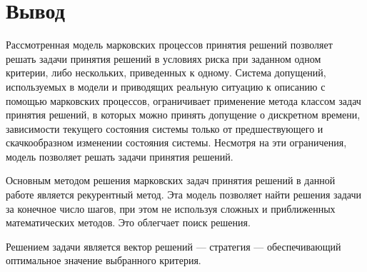 \documentclass[14pt,a4paper,report]{report}
\begin{document}
\section{Вывод}

Рассмотренная модель марковских процессов принятия решений позволяет решать задачи принятия решений в условиях риска при заданном одном критерии, либо нескольких, приведенных к одному. Система допущений, используемых в модели и приводящих реальную ситуацию к описанию с помощью
марковских процессов, ограничивает применение метода классом задач принятия решений, в которых можно принять допущение о дискретном времени, зависимости текущего состояния системы только от предшествующего и скачкообразном изменении состояния системы. Несмотря на эти ограничения, модель позволяет решать задачи принятия решений.

Основным методом решения марковских задач принятия решений в данной работе является рекурентный метод. Эта модель позволяет найти решения задачи за конечное число шагов, при этом не используя сложных и приближенных математических методов. Это облегчает поиск решения.

Решением задачи является вектор решений — стратегия — обеспечивающий оптимальное значение выбранного критерия.
\end{document}
